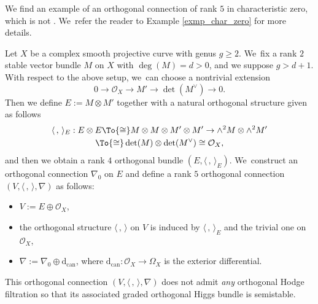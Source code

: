\begin{examp}
We find an example of an orthogonal connection of rank $5$ in characteristic zero, which is not \grsemistable. We~refer the reader to Example \ref{exmp_char_zero} for more details.

Let $X$ be a complex smooth projective curve with genus $g \geq 2$. We~fix a rank $2$ stable vector bundle $M$ on $X$ with $\deg(M)=d>0$, and we suppose $g > d+1$. With respect to the above setup, we~can choose a nontrivial extension
\[
0 \to \mathcal{O}_X \to M' \to \det(M^{\vee}) \to 0.
\]
Then we define $E := M \otimes M'$ together with a natural orthogonal structure given as follows
\begin{multline*}
\langle \,, \, \rangle_E : E \otimes E \To{\cong} M \otimes M \otimes M' \otimes M' \to \wedge^2 M \otimes \wedge^2 M' \\
\To{\cong} \det(M) \otimes \det(M^{\vee}) \cong \mathcal{O}_X,
\end{multline*}
and then we obtain a rank $4$ orthogonal bundle $(E, \langle \,, \, \rangle_E)$. We~construct an orthogonal connection $\nabla_0$ on $E$ and define a rank $5$ orthogonal connection $(V, \langle \,, \, \rangle, \nabla)$ as follows:
\begin{itemize}
\item $V:= E \oplus \mathcal{O}_X$,
\item the orthogonal structure $\langle \,, \, \rangle$ on $V$ is induced by $\langle \,, \, \rangle_E$ and the trivial one on $\mathcal{O}_X$,
\item $\nabla:=\nabla_0 \oplus \mathrm{d}_\mathrm{can}$, where $\mathrm{d}_\mathrm{can}: \mathcal{O}_X \to \Omega_X$ is the exterior differential.
\end{itemize}
This orthogonal connection $(V, \langle \,, \, \rangle, \nabla)$ does not admit \emph{any} orthogonal Hodge filtration so that its associated graded orthogonal Higgs bundle is semistable.
\end{examp}

